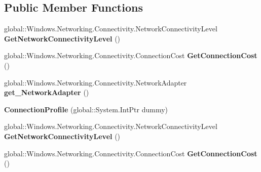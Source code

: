 \subsection*{Public Member Functions}
\begin{DoxyCompactItemize}
\item 
\mbox{\label{class_windows_1_1_networking_1_1_connectivity_1_1_connection_profile_a55f464bd3626b3b75fff3314aa21599b}} 
global\+::\+Windows.\+Networking.\+Connectivity.\+Network\+Connectivity\+Level {\bfseries Get\+Network\+Connectivity\+Level} ()
\item 
\mbox{\label{class_windows_1_1_networking_1_1_connectivity_1_1_connection_profile_a01bd6c7e7e919529b206485420bd6f60}} 
global\+::\+Windows.\+Networking.\+Connectivity.\+Connection\+Cost {\bfseries Get\+Connection\+Cost} ()
\item 
\mbox{\label{class_windows_1_1_networking_1_1_connectivity_1_1_connection_profile_abdb5960f62ef424cf00e068722320644}} 
global\+::\+Windows.\+Networking.\+Connectivity.\+Network\+Adapter {\bfseries get\+\_\+\+Network\+Adapter} ()
\item 
\mbox{\label{class_windows_1_1_networking_1_1_connectivity_1_1_connection_profile_a6c18da83d8ed539cff89b26e114d89c5}} 
{\bfseries Connection\+Profile} (global\+::\+System.\+Int\+Ptr dummy)
\item 
\mbox{\label{class_windows_1_1_networking_1_1_connectivity_1_1_connection_profile_a55f464bd3626b3b75fff3314aa21599b}} 
global\+::\+Windows.\+Networking.\+Connectivity.\+Network\+Connectivity\+Level {\bfseries Get\+Network\+Connectivity\+Level} ()
\item 
\mbox{\label{class_windows_1_1_networking_1_1_connectivity_1_1_connection_profile_a01bd6c7e7e919529b206485420bd6f60}} 
global\+::\+Windows.\+Networking.\+Connectivity.\+Connection\+Cost {\bfseries Get\+Connection\+Cost} ()

\end{DoxyCompactItemize}
